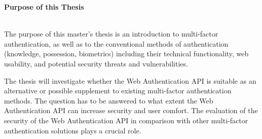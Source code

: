 \thispagestyle{empty}

{}

\begin{large}
	\textbf{Purpose of this Thesis} \\ \\
\end{large}

The purpose of this master's thesis is an introduction to multi-factor authentication, as well as to the conventional methods of authentication (knowledge, possession, biometrics) including their technical functionality, web usability, and potential security threats and vulnerabilities.

The thesis will investigate whether the Web Authentication API is suitable as an alternative or possible supplement to existing multi-factor authentication methods. The question has to be answered to what extent the Web Authentication API can increase security and user comfort. The evaluation of the security of the Web Authentication API in comparison with other multi-factor authentication solutions plays a crucial role.

\newpage